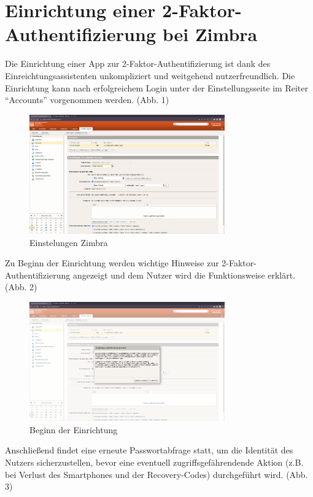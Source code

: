 \documentclass{article}
\begin{document}
\section{Einrichtung einer 2-Faktor-Authentifizierung bei Zimbra}

Die Einrichtung einer App zur 2-Faktor-Authentifizierung ist dank des
Einreichtungsassistenten unkompliziert und weitgehend nutzerfreundlich. Die
Einrichtung kann nach erfolgreichem Login unter der Einstellungsseite im Reiter
``Accounts'' vorgenommen werden. (Abb. 1)

\begin{figure}[H]
	\includegraphics[width=0.75\textwidth]{images/01-einstellung.png}
	\centering
	\caption{Einstelungen Zimbra}
\end{figure}

Zu Beginn der Einrichtung werden wichtige Hinweise zur
2-Faktor-Authentifizierung angezeigt und dem Nutzer wird die Funktionsweise
erklärt. (Abb. 2)

\begin{figure}[H]
	\includegraphics[width=0.75\textwidth]{./images/02-beginn.png}
	\centering
	\caption{Beginn der Einrichtung}
\end{figure}

Anschließend findet eine erneute Passwortabfrage statt, um die Identität des
Nutzers sicherzustellen, bevor eine eventuell zugriffsgefährendende Aktion (z.B.
bei Verlust des Smartphones und der Recovery-Codes) durchgeführt wird. (Abb. 3)
\end{document}
